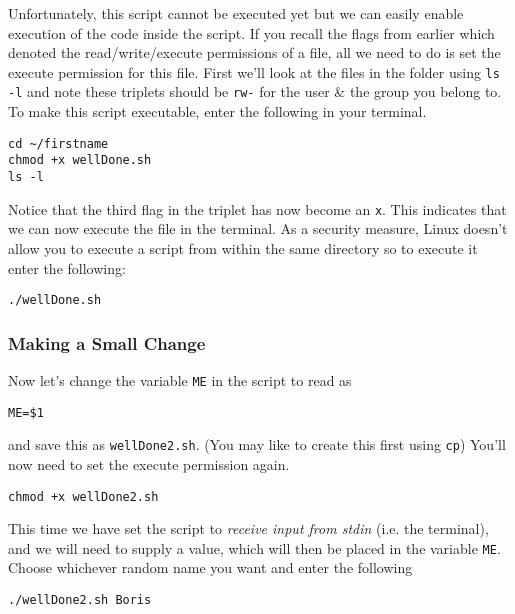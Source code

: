 \begin{steps}
Unfortunately, this script cannot be executed yet but we can easily enable execution of the code inside the script.
If you recall the flags from earlier which denoted the read/write/execute permissions of a file, all we need to do is set the execute permission for this file.
First we'll look at the files in the folder using \texttt{ls -l} and note these triplets should be \texttt{rw-} for the user \& the group you belong to.
To make this script executable, enter the following in your terminal.
\begin{lstlisting}
cd ~/firstname
chmod +x wellDone.sh
ls -l
\end{lstlisting}
\end{steps}

\begin{steps}
Notice that the third flag in the triplet has now become an \texttt{x}.
This indicates that we can now execute the file in the terminal.
As a security measure, Linux doesn't allow you to execute a script from within the same directory so to execute it enter the following:
\begin{lstlisting}
./wellDone.sh
\end{lstlisting}
\end{steps}

\subsubsection{Making a Small Change}

\begin{steps}
Now let's change the variable \texttt{ME} in the script to read as
\begin{lstlisting}
ME=$1
\end{lstlisting}
and save this as \texttt{wellDone2.sh}.
(You may like to create this first using \texttt{cp})
You'll now need to set the execute permission again.
\begin{lstlisting}
chmod +x wellDone2.sh
\end{lstlisting}
\end{steps}

\begin{information}
This time we have set the script to \textit{receive input from stdin} (i.e. the terminal), and we will need to supply a value, which will then be placed in the variable \texttt{ME}.
Choose whichever random name you want and enter the following
\begin{lstlisting}
./wellDone2.sh Boris
\end{lstlisting}
\end{information}

